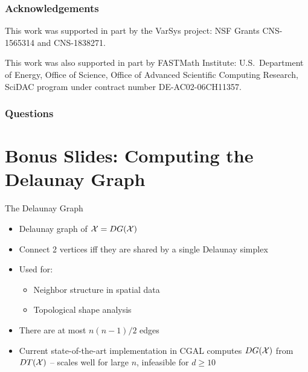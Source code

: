 \documentclass[aspectratio=169]{beamer}
\begin{document}
\begin{frame}
\frametitle{Acknowledgements}

This work was supported in part by the VarSys project:
NSF Grants CNS-1565314 and CNS-1838271.

\bigskip

This work was also supported in part by FASTMath Institute:
U.S.~Department of Energy,
Office of Science, Office of Advanced Scientific Computing Research,
SciDAC program under contract number DE-AC02-06CH11357.

\end{frame}

\begin{frame}
  \frametitle{Questions}
  \tableofcontents
  \bigskip
\end{frame}

\section{Bonus Slides: Computing the Delaunay Graph}

\begin{frame}{The Delaunay Graph}
\begin{itemize}
\item Delaunay graph of ${\cal X} = DG({\cal X})$
\item Connect 2 vertices iff they are shared by a single Delaunay simplex
\item Used for:
\begin{itemize}
\item Neighbor structure in spatial data
\item Topological shape analysis
\end{itemize}
\item There are at most $n(n-1)/2$ edges
\item Current state-of-the-art implementation in CGAL computes $DG({\cal X})$ from
$DT({\cal X})$ -- scales well for large $n$, infeasible for $d\geq10$
\end{itemize}
\end{frame}
\end{document}
